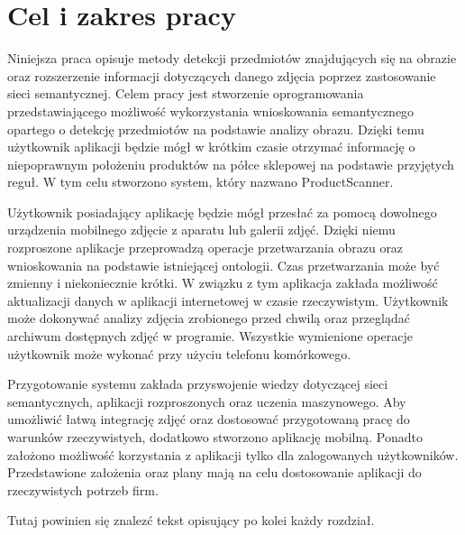 \section{Cel i zakres pracy}
Niniejsza praca opisuje metody detekcji przedmiotów znajdujących się na obrazie oraz rozszerzenie informacji dotyczących danego zdjęcia poprzez zastosowanie sieci semantycznej. Celem pracy jest stworzenie oprogramowania przedstawiającego możliwość wykorzystania wnioskowania semantycznego opartego o detekcję przedmiotów na podstawie analizy obrazu. Dzięki temu użytkownik aplikacji będzie mógł w krótkim czasie otrzymać informację o niepoprawnym położeniu produktów na półce sklepowej na podstawie przyjętych reguł. W tym celu stworzono system, który nazwano ProductScanner.

Użytkownik posiadający aplikację będzie mógł przesłać za pomocą dowolnego urządzenia mobilnego zdjęcie z aparatu lub galerii zdjęć. Dzięki niemu rozproszone aplikacje przeprowadzą operacje przetwarzania obrazu oraz wnioskowania na podstawie istniejącej ontologii. Czas przetwarzania może być zmienny i niekoniecznie krótki. W związku z tym aplikacja zakłada możliwość aktualizacji danych w aplikacji internetowej w czasie rzeczywistym. Użytkownik może dokonywać analizy zdjęcia zrobionego przed chwilą oraz przeglądać archiwum dostępnych zdjęć w programie. Wszystkie wymienione operacje użytkownik może wykonać przy użyciu telefonu komórkowego.

Przygotowanie systemu zakłada przyswojenie wiedzy dotyczącej sieci semantycznych, aplikacji rozproszonych oraz uczenia maszynowego. Aby umożliwić łatwą integrację zdjęć oraz dostosować przygotowaną pracę do warunków rzeczywistych, dodatkowo stworzono aplikację mobilną. Ponadto założono możliwość korzystania z aplikacji tylko dla zalogowanych użytkowników. Przedstawione założenia oraz plany mają na celu dostosowanie aplikacji do rzeczywistych potrzeb firm.

Tutaj powinien się znalezć tekst opisujący po kolei każdy rozdział.